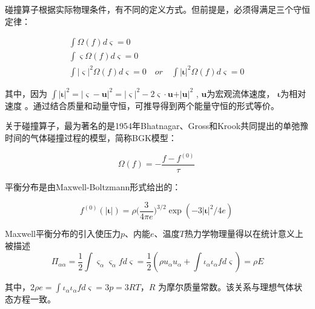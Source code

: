 \documentclass[MathematicsNumericsDerivationsAndOpenFOAM.tex]{subfiles}
\begin{document}
碰撞算子根据实际物理条件，有不同的定义方式。但前提是，必须得满足三个守恒定律：

\begin{equation}
  \begin{aligned}
    \int  \Omega \left( f \right) d\boldsymbol{\varsigma} =0                        \\
    \int \boldsymbol{\varsigma}  \Omega \left( f \right) d\boldsymbol{\varsigma} =0 \\
    \int  \vert \boldsymbol{\varsigma}  \vert ^{2} \Omega \left( f \right) d\boldsymbol{\varsigma} =0 \quad or \quad  \int\vert \boldsymbol{\iota}\vert^2 \Omega \left( f \right) d\boldsymbol{\varsigma} =0
  \end{aligned}
  \label{EQUATION::碰撞算子三个守恒} ~
\end{equation}




其中，因为 $ \int\vert \boldsymbol{\iota}\vert^2 =\vert \boldsymbol{\varsigma} -\boldsymbol{u} \vert^2 = \vert \boldsymbol{\varsigma}  \vert ^{2}-2\boldsymbol{\varsigma} \cdot \boldsymbol{u}+ \vert \boldsymbol{u} \vert ^{2}$ , $\boldsymbol{u}$为宏观流体速度， $\boldsymbol{\iota}$为相对速度 。通过结合质量和动量守恒，可推导得到两个能量守恒的形式等价。


关于碰撞算子，最为著名的是1954年Bhatnagar、Gross和Krook共同提出的单弛豫时间的气体碰撞过程的模型，简称BGK模型：

\begin{equation}
  \boxed{
  \Omega(f)= -\frac{f-f^{(0)}}{\tau}
  }
  \label{EQUATION::BGK模型1} ~
\end{equation}

平衡分布是由Maxwell-Boltzmann形式给出的：

\begin{equation}
  \boxed{
    f^{(0)}(| \boldsymbol{\iota}|) = \rho {(\frac{3}{4\pi e}})^{3/2} \exp({-3| \boldsymbol{\iota}|^2/4e})
  }
  \label{EQUATION::平衡分布} ~
\end{equation}

Maxwell平衡分布的引入使压力$p$、内能$e$、温度$T$热力学物理量得以在统计意义上被描述
\begin{equation}
  \Pi _{ \alpha  \alpha }= \frac{1}{2}\int \varsigma_{ \alpha } \varsigma_{ \alpha }fd\boldsymbol{\varsigma} = \frac{1}{2} (\rho u_\alpha u_\alpha + \int \iota_{ \alpha } \iota_{ \alpha }fd\boldsymbol{\varsigma} )  =\rho E
\end{equation}

其中，$2\rho e= \int \iota_{ \alpha } \iota_{ \alpha }fd\boldsymbol{\varsigma} = 3p =3RT$，$R$ 为摩尔质量常数。该关系与理想气体状态方程一致。
\end{document}
